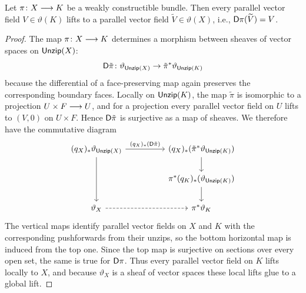 \begin{proposition}\label{prop: lifts weak}
    Let $\pi\colon X \longrightarrow K$ be a weakly constructible bundle. Then every parallel vector field $V \in \vartheta(K)$ lifts to a parallel vector field $\widetilde{V}\in \vartheta(X)$, i.e., $\mathsf D \pi (\widetilde{V}) = V$.
\end{proposition}
\begin{proof}
    The map $\pi\colon X \longrightarrow K$ determines a morphism between sheaves of vector spaces on $\operatorname{\sf Unzip}(X)$:
\begin{equation}
    \mathsf D \tilde{\pi} \colon \vartheta_{\operatorname{\sf Unzip}(X)} \rightarrow \tilde{\pi}^{\ast}\vartheta_{\operatorname{\sf Unzip}(K)}
\end{equation}
because the differential of a face-preserving map again preserves the corresponding boundary faces. Locally on $\operatorname{\sf Unzip}(K)$, the map $\tilde{\pi}$ is isomorphic to a projection $U\times F \longrightarrow U$, and for a projection every parallel vector field on $U$ lifts to $(V,0)$ on $U\times F$. Hence $\mathsf D\tilde{\pi}$ is surjective as a map of sheaves. We therefore have the commutative diagram
\begin{equation}
\begin{tikzcd}[ampersand replacement=\&]
	{(q_X)_\ast\vartheta_{\unzip(X)}} \&\& {(q_X)_\ast (\tilde{\pi}^\ast\vartheta_{\unzip(K)})} \\
	\&\& {\pi^\ast (q_K)_{\ast}(\vartheta_{\unzip(K)})} \\
	{\vartheta_X} \&\& {\pi^\ast\vartheta_K}
	\arrow["{(q_X)_\ast(\sD \tilde{\pi})}", from=1-1, to=1-3]
	\arrow[from=1-1, to=3-1]
	\arrow[from=1-3, to=2-3]
	\arrow[from=2-3, to=3-3]
	\arrow[dashed, from=3-1, to=3-3]
\end{tikzcd}
\end{equation}
The vertical maps identify parallel vector fields on $X$ and $K$ with the corresponding pushforwards from their unzips, so the bottom horizontal map is induced from the top one. Since the top map is surjective on sections over every open set, the same is true for $\mathsf D\pi$. Thus every parallel vector field on $K$ lifts locally to $X$, and because $\vartheta_X$ is a sheaf of vector spaces these local lifts glue to a global lift.
\end{proof}

